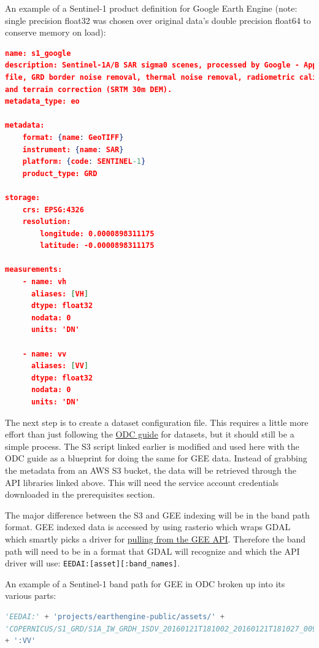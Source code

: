 \documentclass{article}
\begin{document}
An example of a Sentinel-1 product definition for Google Earth Engine (note:
single precision float32 was chosen over original data's double precision
float64 to conserve memory on load):
\begin{lstlisting}[language=json]
name: s1_google
description: Sentinel-1A/B SAR sigma0 scenes, processed by Google - Apply orbit
file, GRD border noise removal, thermal noise removal, radiometric calibration,
and terrain correction (SRTM 30m DEM).
metadata_type: eo

metadata:
	format: {name: GeoTIFF}
	instrument: {name: SAR}
	platform: {code: SENTINEL-1}
	product_type: GRD

storage:
	crs: EPSG:4326
	resolution:
		longitude: 0.0000898311175
		latitude: -0.0000898311175

measurements:
	- name: vh
	  aliases: [VH]
	  dtype: float32
	  nodata: 0
	  units: 'DN'

	- name: vv
	  aliases: [VV]
	  dtype: float32
	  nodata: 0
	  units: 'DN'
\end{lstlisting}

The next step is to create a dataset configuration file. This requires
a little more effort than just following the
\href{https://datacube-core.readthedocs.io/en/latest/ops/dataset_documents.html}{ODC
guide} for datasets, but it should still be a simple process. The S3 script
linked earlier is modified and used here with the ODC guide as a blueprint for
doing the same for GEE data. Instead of grabbing the metadata from an AWS S3
bucket, the data will be retrieved through the API libraries linked above. This
will need the service account credentials downloaded in the prerequisites
section.

The major difference between the S3 and GEE indexing will be in the band path
format. GEE indexed data is accessed by using rasterio
which wraps GDAL which smartly picks a driver for
\href{https://gdal.org/drivers/raster/eedai.html}{pulling from the GEE API}.
Therefore the band path will need to be in a format that GDAL will recognize
and which the API driver will use: \lstinline{EEDAI:[asset][:band_names]}.

An example of a Sentinel-1 band path for GEE in ODC broken up into its various
parts:
\begin{lstlisting}[language=python]
'EEDAI:' + 'projects/earthengine-public/assets/' +
'COPERNICUS/S1_GRD/S1A_IW_GRDH_1SDV_20160121T181002_20160121T181027_009596_00DF74_ABC5'
+ ':VV'
\end{lstlisting}
\end{document}
